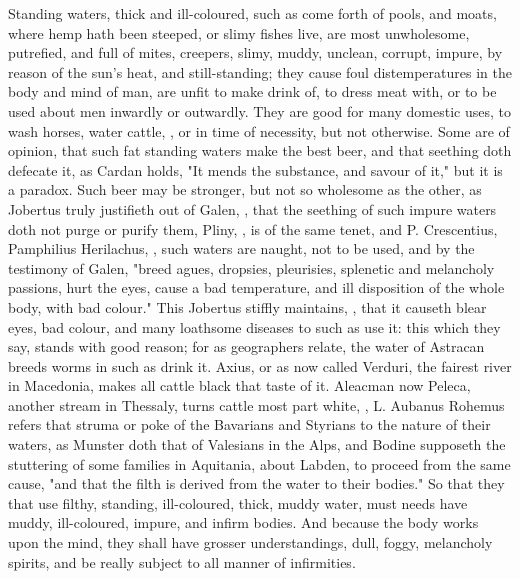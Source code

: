 Standing waters, thick and ill-coloured, such as come forth of pools, and
moats, where hemp hath been steeped, or slimy fishes live, are most
unwholesome, putrefied, and full of mites, creepers, slimy, muddy, unclean,
corrupt, impure, by reason of the sun's heat, and still-standing; they cause
foul distemperatures in the body and mind of man, are unfit to make drink of,
to dress meat with, or to be used about men inwardly or
outwardly. They are good for many domestic uses, to wash horses, water cattle,
\etc{}, or in time of necessity, but not otherwise. Some are of opinion, that
such fat standing waters make the best beer, and that seething doth defecate
it, as Cardan holds,  "It mends the substance, and savour of it," but it is a paradox. Such
beer may be stronger, but not so wholesome as the other, as
Jobertus truly justifieth out of Galen,
, that the seething of such
impure waters doth not purge or purify them, Pliny, , is of the same tenet, and P. Crescentius,
 Pamphilius
Herilachus, , such waters are
naught, not to be used, and by the testimony of Galen,
"breed agues, dropsies, pleurisies, splenetic and melancholy passions, hurt the
eyes, cause a bad temperature, and ill disposition of the whole body, with bad
colour." This Jobertus stiffly maintains, , that it causeth blear eyes, bad colour, and many loathsome diseases
to such as use it: this which they say, stands with good reason; for as
geographers relate, the water of Astracan breeds worms in such as drink it.
Axius, or as now called Verduri, the fairest river in
Macedonia, makes all cattle black that taste of it. Aleacman now Peleca,
another stream in Thessaly, turns cattle most part white, ,
L. Aubanus Rohemus refers that struma or poke of the
Bavarians and Styrians to the nature of their waters, as
Munster doth that of Valesians in the Alps, and
Bodine supposeth the stuttering of some families in
Aquitania, about Labden, to proceed from the same cause, "and that the filth is
derived from the water to their bodies." So that they that use filthy,
standing, ill-coloured, thick, muddy water, must needs have muddy,
ill-coloured, impure, and infirm bodies. And because the body works upon the
mind, they shall have grosser understandings, dull, foggy, melancholy spirits,
and be really subject to all manner of infirmities.

